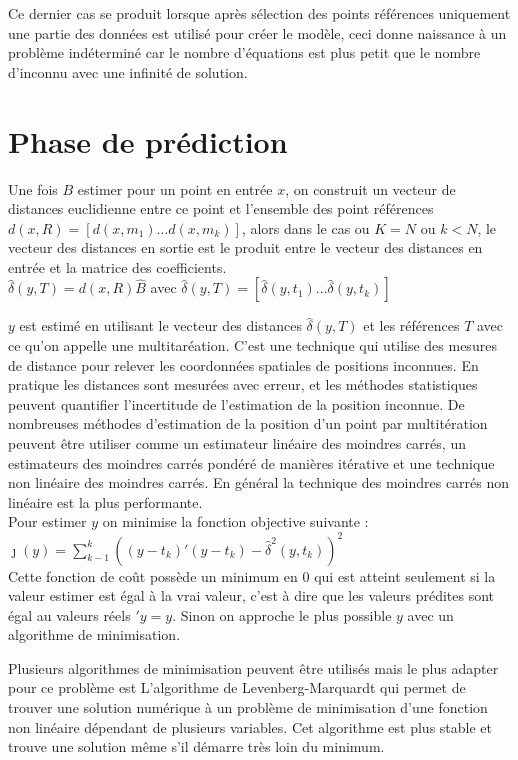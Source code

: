\documentclass[12pt,a4paper]{report}
\begin{document}
Ce dernier cas  se produit lorsque après sélection des points références uniquement une partie des données est utilisé pour créer le modèle, ceci donne naissance à un problème indéterminé car le nombre d'équations est plus petit que le nombre d'inconnu avec une infinité de solution. 
{\color{MidnightBlue}\section{Phase de prédiction}}
\par Une fois $B$ estimer pour un point en entrée $x$, on construit un vecteur de distances euclidienne entre ce point et l'ensemble des point références $d(x,R) = [d(x,m_1)...d(x,m_k)]$, alors dans le cas ou $K = N$ ou $k < N$, le vecteur des distances en sortie est le produit entre le vecteur des distances en entrée et la matrice des coefficients.\\
$\hat{\delta}(y,T) = d(x,R)\hat{B}$ avec $\hat{\delta}(y,T) = [\hat{\delta}(y,t_1)...\hat{\delta}(y,t_k)]$

\par $y$ est estimé en utilisant le vecteur des distances $\hat{\delta}(y,T)$ et les références $T$ avec ce qu'on appelle une multitaréation. C'est une technique qui utilise des mesures de distance pour relever les coordonnées spatiales de positions inconnues. En pratique les distances sont mesurées avec erreur, et les méthodes statistiques peuvent quantifier l'incertitude de l'estimation de la position inconnue. De nombreuses méthodes d'estimation de la position d'un point par multitération peuvent être utiliser comme un estimateur linéaire des moindres carrés, un estimateurs des moindres carrés pondéré de manières itérative et une technique non linéaire des moindres carrés. En général la technique des moindres carrés non linéaire est la plus performante.\\
Pour estimer $y$ on minimise la fonction objective suivante :\\
$\jmath(y) = \sum_{k-1}^{k}((y-t_k)\prime(y-t_k)-\hat{\delta}^2(y,t_k))^2$ \\
Cette fonction de coût possède un minimum en 0 qui est atteint seulement si la valeur estimer est égal à la vrai valeur, c'est à dire que les valeurs prédites sont égal au valeurs réels $\prime{y} = y$. Sinon on approche le plus possible $y$ avec un algorithme de minimisation. \\
\par Plusieurs algorithmes de minimisation peuvent être utilisés mais le plus adapter pour ce problème est L'algorithme de Levenberg-Marquardt qui permet de trouver une solution numérique à un problème de minimisation d'une fonction non linéaire dépendant de plusieurs variables. Cet algorithme est plus stable et trouve une solution même s'il démarre très loin du minimum. 
\end{document}
